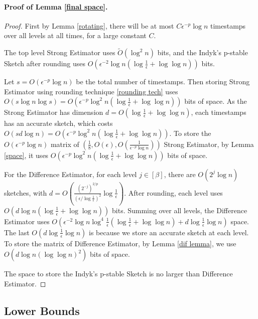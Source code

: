 \documentclass{article}
\newcommand{\est}{\textsf{Strong Estimator }}
\newcommand{\estt}{\textsf{Strong Estimator}}
\newcommand{\ind}{\textsf{Indyk's p-stable Sketch }}
\newcommand{\dif}{\textsf{Difference Estimator }}
\newcommand{\diff}{\textsf{Difference Estimator}}
\theoremstyle{plain}
\begin{document}
\paragraph{Proof of Lemma \ref{final space}.}
\begin{proof}
First by Lemma \ref{rotating}, there will be at most $C\epsilon ^ {-p} \log n$ timestamps over all levels at all times, for a large constant $C$.    

The top level \est uses $\tilde{O}(\log ^ 2n)$ bits, and the \ind after rounding uses $O(\epsilon ^ {-2}\log n (\log \frac{1}{\epsilon} + \log \log n))$ bits.
    
    Let $s = O(\epsilon ^ {-p} \log n)$ be the total number of timestamps. Then storing \est using rounding technique \ref{rounding tech} uses $O(s\log n\log s) = O(\epsilon ^ {-p} \log ^ 2n (\log \frac 1{\epsilon} + \log \log n))$ bits of space. As the \est has dimension $d = O(\log \frac 1{\epsilon}+\log \log n)$, each timestamps has an accurate sketch, which costs $O(sd \log n) = O(\epsilon ^ {-p} \log ^ 2n (\log \frac 1{\epsilon} + \log \log n))$.     To store the $O(\epsilon ^ {-p} \log n)$ matrix of $(\frac 18, O(\epsilon), O(\frac 1{\epsilon ^ {-p}\log n}))$ \estt, by Lemma \ref{space}, it uses $O(\epsilon ^ {-p} \log ^ 2n (\log \frac 1{\epsilon} + \log \log n))$ bits of space. 

    For the \diff, for each level $j\in [\beta]$, there are $O(2 ^ j \log n)$ sketches, with $d = O(\frac{(2 ^ {-j}) ^ {2/p}}{(\epsilon / \log \frac 1{\epsilon}) ^ 2} \log \frac{1}{\epsilon})$. After rounding, each level uses $O(d\log n (\log \frac 1{\epsilon} + \log \log n))$ bits. Summing over all levels, the \dif uses $O(\epsilon^ {-2} \log n \log ^ 4\frac 1{\epsilon}(\log \frac 1{\epsilon} + \log \log n)  + d \log \frac 1{\epsilon}\log n)$ space. The last $O(d \log \frac 1{\epsilon}\log n)$ is because we store an accurate sketch at each level. To store the matrix of \diff, by Lemma \ref{dif lemma}, we use $O(d\log n(\log \log n) ^ 2)$ bits of space. 

    The space to store the \ind is no larger than \diff. 

\end{proof}

\subsection{Lower Bounds}
\end{document}
